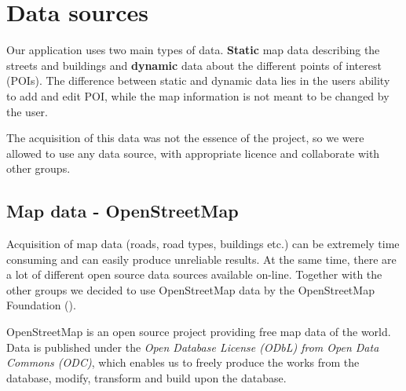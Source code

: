 
\chapter{Data sources} %

\label{Chapter4} %


Our application uses two main types of data. \textbf{Static} map data describing the streets and buildings and \textbf{dynamic} data about the different points of interest (POIs). The difference between static and dynamic data lies in the users ability to add and edit POI, while the map information is not meant to be changed by the user.
\par The acquisition of this data was not the essence of the project, so we were allowed to use any data source, with appropriate licence and collaborate with other groups. 

\section{Map data - OpenStreetMap}
Acquisition of map data (roads, road types, buildings etc.) can be extremely time consuming and can easily produce unreliable results. At the same time, there are a lot of different open source data sources available on-line. Together with the other groups we decided to use OpenStreetMap data by the OpenStreetMap Foundation (\cite{osm}).
\par OpenStreetMap is an open source project providing free map data of the world. Data is published under the \textit{Open Database License (ODbL) from Open Data Commons (ODC)}, which enables us to freely produce the works from the database, modify, transform and build upon the database.

